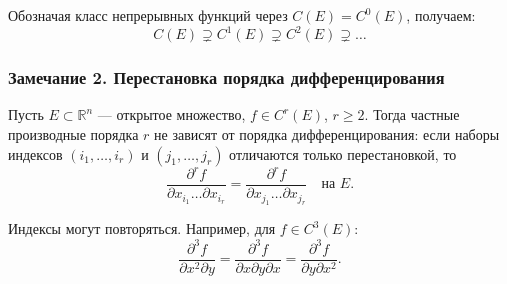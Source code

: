 Обозначая класс непрерывных функций через $C(E)=C^0(E)$, получаем:
\[
  C(E)\supsetneq C^1(E)\supsetneq C^2(E)\supsetneq\ldots
\]

\subsubsection*{Замечание 2. Перестановка порядка дифференцирования}

Пусть $E\subset\mathbb R^n$ --- открытое множество, $f\in C^r(E)$, $r\ge2$.
Тогда частные производные порядка $r$ не зависят от порядка дифференцирования: если наборы индексов $(i_1,\ldots,i_r)$ и $(j_1,\ldots,j_r)$ отличаются только перестановкой, то
\[
  \frac{\partial^r f}{\partial x_{i_1}\ldots\partial x_{i_r}}
  =\frac{\partial^r f}{\partial x_{j_1}\ldots\partial x_{j_r}}
  \quad\text{на }E.
\]

Индексы могут повторяться.
Например, для $f\in C^3(E)$:
\[
  \frac{\partial^3 f}{\partial x^2\partial y}
  =\frac{\partial^3 f}{\partial x\partial y\partial x}
  =\frac{\partial^3 f}{\partial y\partial x^2}.
\]
